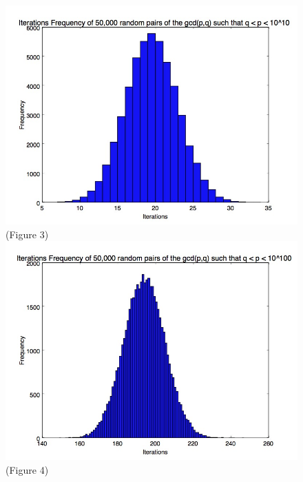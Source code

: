 \documentclass[11pt]{article}
\begin{document}
	\begin{figure}
		\centering
		\includegraphics[scale=.45]{10_digit_numbers.jpg}
		\center \tiny(Figure 3)
			\includegraphics[scale=.45]{100_digit_numbers_freq.jpg}
		\center \tiny(Figure 4)
		
	\end{figure}
	
	
	
\end{document}
